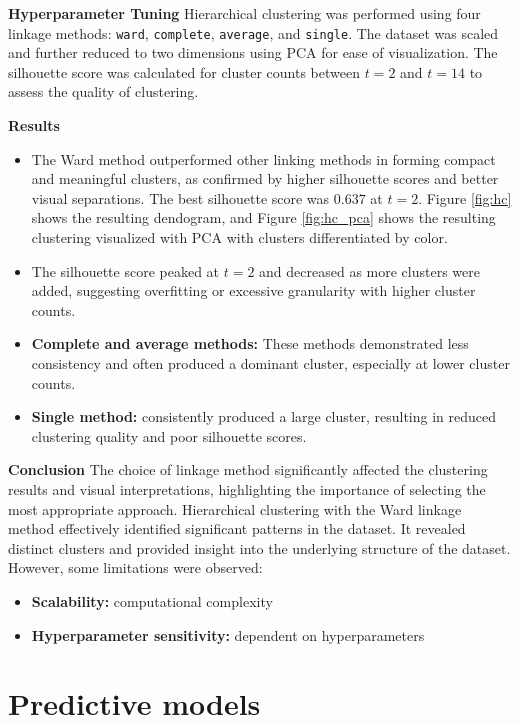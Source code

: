 \documentclass[a4paper, twoside]{article}
\begin{document}
\textbf{Hyperparameter Tuning}
Hierarchical clustering was performed using four linkage methods: \texttt{ward}, \texttt{complete}, \texttt{average}, and \texttt{single}. The dataset was scaled and further reduced to two dimensions using PCA for ease of visualization. The silhouette score was calculated for cluster counts between $t=2$ and $t=14$ to assess the quality of clustering.



\textbf{Results}
\begin{itemize}[noitemsep]
\item The Ward method outperformed other linking methods in forming compact and meaningful clusters, as confirmed by higher silhouette scores and better visual separations. The best silhouette score was $0.637$ at $t=2$. Figure \ref{fig:hc} shows the resulting dendogram, and Figure \ref{fig:hc_pca} shows the resulting clustering visualized with PCA with clusters differentiated by color.
\item The silhouette score peaked at $t=2$ and decreased as more clusters were added, suggesting overfitting or excessive granularity with higher cluster counts.
\item \textbf{Complete and average methods:} These methods demonstrated less consistency and often produced a dominant cluster, especially at lower cluster counts. 
\item \textbf{Single method:} consistently produced a large cluster, resulting in reduced clustering quality and poor silhouette scores.
\end{itemize}

\textbf{Conclusion}
The choice of linkage method significantly affected the clustering results and visual interpretations, highlighting the importance of selecting the most appropriate approach. Hierarchical clustering with the Ward linkage method effectively identified significant patterns in the dataset. It revealed distinct clusters and provided insight into the underlying structure of the dataset. However, some limitations were observed:

\begin{itemize}[noitemsep]
\item \textbf{Scalability:} computational complexity
\item \textbf{Hyperparameter sensitivity:} dependent on hyperparameters
\end{itemize}

\section{Predictive models}
\end{document}
